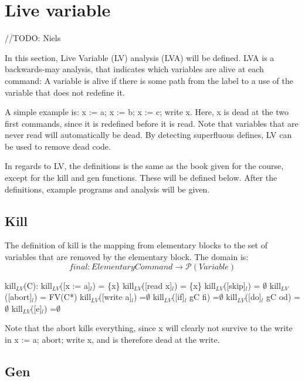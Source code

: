 
\section{Live variable}

//TODO: Niels

In this section, Live Variable (LV) analysis (LVA) will be defined.
LVA is a backwards-may analysis, that indicates which variables are
alive at each command: A variable is alive if there is some path
from the label to a use of the variable that does not redefine it.

  A simple example is: x := a; x := b; x := c; write x.
Here, x is dead at the two first commands, since it is redefined
before it is read. Note that variables that are never read will
automatically be dead. By detecting superfluous defines, LV
can be used to remove dead code.

In regards to LV, the definitions is the same as the book given for the course,
except for the kill and gen functions. These will be defined below.
After the definitions, example programs and analysis will be given.

\subsection{Kill}

The definition of kill is the mapping from elementary blocks to the set of variables
that are removed by the elementary block. The domain is:
\[final \colon Elementary Command \to \mathcal{P}(Variable)\]

\docpar
kill$_{LV}$(C):\newline
kill$_{LV}$([x := a]$_l$)           = \{x\}
kill$_{LV}$([read x]$_l$)           = \{x\}
kill$_{LV}$([skip]$_l$)             = $\emptyset$\newline
kill$_{LV}$([abort]$_l$) 			= FV(C*)\newline
kill$_{LV}$([write a]$_l$)          =$\emptyset$\newline
kill$_{LV}$([if]$_l$ gC fi)         =$\emptyset$\newline
kill$_{LV}$([do]$_l$ gC od)         =$\emptyset$\newline
kill$_{LV}$([e]$_l$)                =$\emptyset$\newline

Note that the abort kills everything, since x will clearly not survive to the write in
x := a; abort; write x, and is therefore dead at the write.

\subsection{Gen}

